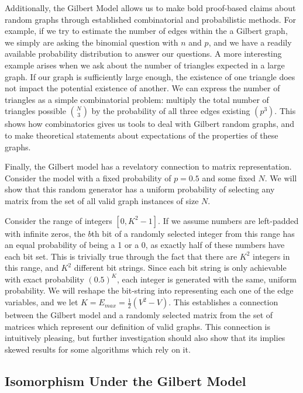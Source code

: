 \documentclass[11pt,a4paper]{report}
\begin{document}
Additionally, the Gilbert Model allows us to make bold proof-based claims about random graphs through established combinatorial and probabilistic methods.
For example, if we try to estimate the number of edges within the a Gilbert graph, we simply are asking the binomial question with $n$ and $p$, and we have a readily available probability distribution to answer our questions.
A more interesting example arises when we ask about the number of triangles expected in a large graph.
If our graph is sufficiently large enough, the existence of one triangle does not impact the potential existence of another.
We can express the number of triangles as a simple combinatorial problem: multiply the total number of triangles possible $\binom{N}{3}$ by the probability of all three edges existing $(p^3)$.
This shows how combinatorics gives us tools to deal with Gilbert random graphs, and to make theoretical statements about expectations of the properties of these graphs.

Finally, the Gilbert model has a revelatory connection to matrix representation.
Consider the model with a fixed probability of $p=0.5$ and some fixed $N$.
We will show that this random generator has a uniform probability of selecting any matrix from the set of all valid graph instances of size $N$.

Consider the range of integers $[0, K^2 - 1]$.
If we assume numbers are left-padded with infinite zeros, the $b$th bit of a randomly selected integer from this range has an equal probability of being a 1 or a 0, as exactly half of these numbers have each bit set.
This is trivially true through the fact that there are $K^2$ integers in this range, and $K^2$ different bit strings.
Since each bit string is only achievable with exact probability $(0.5)^K$, each integer is generated with the same, uniform probability.
We will reshape the bit-string into representing each one of the edge variables, and we let $K = E_{max} = \frac{1}{2}(V^2 - V)$.
This establishes a connection between the Gilbert model and a randomly selected matrix from the set of matrices which represent our definition of valid graphs. 
This connection is intuitively pleasing, but further investigation should also show that its implies skewed results for some algorithms which rely on it.

\subsection{Isomorphism Under the Gilbert Model}
\end{document}
